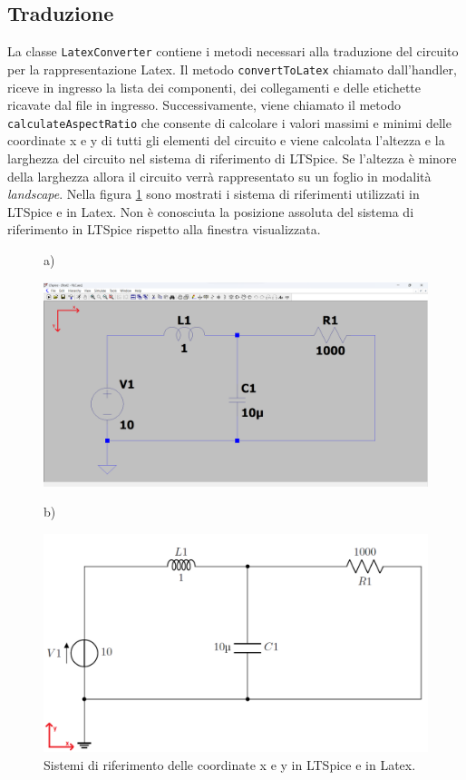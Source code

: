\subsection{Traduzione}
La classe \texttt{LatexConverter} contiene i metodi necessari alla traduzione del circuito per la rappresentazione Latex. Il metodo \texttt{convertToLatex} chiamato dall'handler, riceve in ingresso la lista dei componenti, dei collegamenti e delle etichette ricavate dal file in ingresso. Successivamente, viene chiamato il metodo \texttt{calculateAspectRatio} che consente di calcolare i valori massimi e minimi delle coordinate x e y di tutti gli elementi del circuito e viene calcolata l'altezza e la larghezza del circuito nel sistema di riferimento di LTSpice. Se l'altezza è minore della larghezza allora il circuito verrà rappresentato su un foglio in modalità \textit{landscape}. Nella figura \ref{fig:sdr} sono mostrati i sistema di riferimenti utilizzati in LTSpice e in Latex. Non è conosciuta la posizione assoluta del sistema di riferimento in LTSpice rispetto alla finestra visualizzata.
\begin{figure}[h!]
	\centering
	a)
	\begin{minipage}{.460\textwidth}
		\includegraphics[width=\linewidth]{./ImageFiles/sdr-lt.png}
	\end{minipage}
	b)
	\begin{minipage}{.460\textwidth}
		\includegraphics[width=\linewidth]{./ImageFiles/sdr-latex.png}
	\end{minipage}
	\caption{Sistemi di riferimento delle coordinate x e y in LTSpice e in Latex.}
	\label{fig:sdr}
\end{figure}

